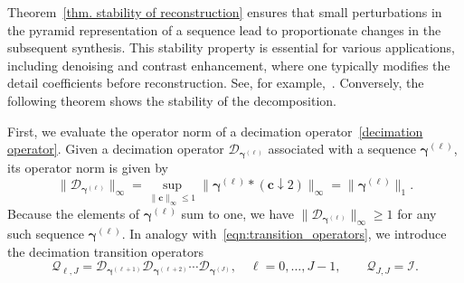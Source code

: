 \documentclass[11pt,a4paper]{article}
\theoremstyle{definition}
\begin{document}
Theorem~\ref{thm. stability of reconstruction} ensures that small perturbations in the pyramid representation of a sequence lead to proportionate changes in the subsequent synthesis. This stability property is essential for various applications, including denoising and contrast enhancement, where one typically modifies the detail coefficients before reconstruction. See, for example,~\cite{mattar2023pyramid, mattar2023pseudo}. Conversely, the following theorem shows the stability of the decomposition.

First, we evaluate the operator norm of a decimation operator~\eqref{decimation operator}. Given a decimation operator $\mathcal{D}_{\boldsymbol{\gamma}^{(\ell)}}$ associated with a sequence $\boldsymbol{\gamma}^{(\ell)}$, its operator norm is given by
\begin{equation}\label{eqn:decimation_operator_norm}
    \|\mathcal{D}_{\boldsymbol{\gamma}^{(\ell)}}\|_\infty=\sup_{\|\boldsymbol{c}\|_\infty\leq1}\|\boldsymbol{\gamma}^{(\ell)}*(\boldsymbol{c}\downarrow 2)\|_\infty=\|\boldsymbol{\gamma}^{(\ell)}\|_1.
\end{equation}
Because the elements of $\boldsymbol{\gamma}^{(\ell)}$ sum to one, we have $\|\mathcal{D}_{\boldsymbol{\gamma}^{(\ell)}}\|_\infty\geq 1$ for any such sequence $\boldsymbol{\gamma}^{(\ell)}$. In analogy with~\eqref{eqn:transition_operators}, we introduce the decimation transition operators
\begin{equation}\label{eqn:decimation_transition}
    \mathcal{Q}_{\ell,J}=\mathcal{D}_{\boldsymbol{\gamma}^{(\ell+1)}}\mathcal{D}_{\boldsymbol{\gamma}^{(\ell+2)}}\cdots\mathcal{D}_{\boldsymbol{\gamma}^{(J)}}, \quad \ell=0,\dots,J-1, \qquad \mathcal{Q}_{J,J}=\mathcal{I}.
\end{equation}
\end{document}
